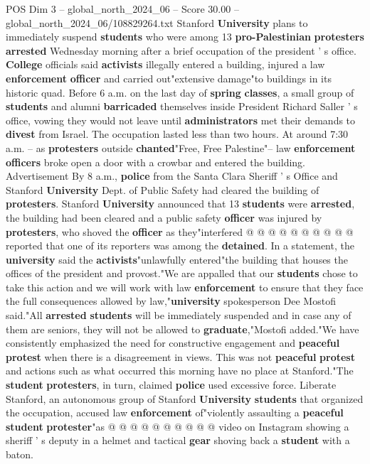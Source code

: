 \begin{textsample}{POS Dim 3 – global\_north\_2024\_06 – Score 30.00 – global\_north\_2024\_06/108829264.txt}  \label{ex:f3_pos_061}
Stanford \textbf{University} plans to immediately suspend \textbf{students} who were among 13 \textbf{pro-Palestinian} \textbf{protesters} \textbf{arrested} Wednesday morning after a brief occupation of the president ' s office. \textbf{College} officials said \textbf{activists} illegally entered a building, injured a law \textbf{enforcement} \textbf{officer} and carried out"extensive damage"to buildings in its historic quad.
Before 6 a.m. on the last day of \textbf{spring} \textbf{classes}, a small group of \textbf{students} and alumni \textbf{barricaded} themselves inside President Richard Saller ' s office, vowing they would not leave until \textbf{administrators} met their demands to \textbf{divest} from Israel.
The occupation lasted less than two hours.
At around 7:30 a.m. -- as \textbf{protesters} outside \textbf{chanted}"Free, Free Palestine"-- law \textbf{enforcement} \textbf{officers} broke open a door with a crowbar and entered the building.
Advertisement By 8 a.m., \textbf{police} from the Santa Clara Sheriff ' s Office and Stanford \textbf{University} Dept. of Public Safety had cleared the building of \textbf{protesters}.
Stanford \textbf{University} announced that 13 \textbf{students} were \textbf{arrested}, the building had been cleared and a public safety \textbf{officer} was injured by \textbf{protesters}, who shoved the \textbf{officer} as they"interfered @ @ @ @ @ @ @ @ @ @ reported that one of its reporters was among the \textbf{detained}.
In a statement, the \textbf{university} said the \textbf{activists}"unlawfully entered"the building that houses the offices of the president and provost."We are appalled that our \textbf{students} chose to take this action and we will work with law \textbf{enforcement} to ensure that they face the full consequences allowed by law,"\textbf{university} spokesperson Dee Mostofi said."All \textbf{arrested} \textbf{students} will be immediately suspended and in case any of them are seniors, they will not be allowed to \textbf{graduate},"Mostofi added."We have consistently emphasized the need for constructive engagement and \textbf{peaceful} \textbf{protest} when there is a disagreement in views.
This was not \textbf{peaceful} \textbf{protest} and actions such as what occurred this morning have no place at Stanford."The \textbf{student} \textbf{protesters}, in turn, claimed \textbf{police} used excessive force.
Liberate Stanford, an autonomous group of Stanford \textbf{University} \textbf{students} that organized the occupation, accused law \textbf{enforcement} of"violently assaulting a \textbf{peaceful} \textbf{student} \textbf{protester}"as @ @ @ @ @ @ @ @ @ @ video on Instagram showing a sheriff ' s deputy in a helmet and tactical \textbf{gear} shoving back a \textbf{student} with a baton.

\end{textsample}
